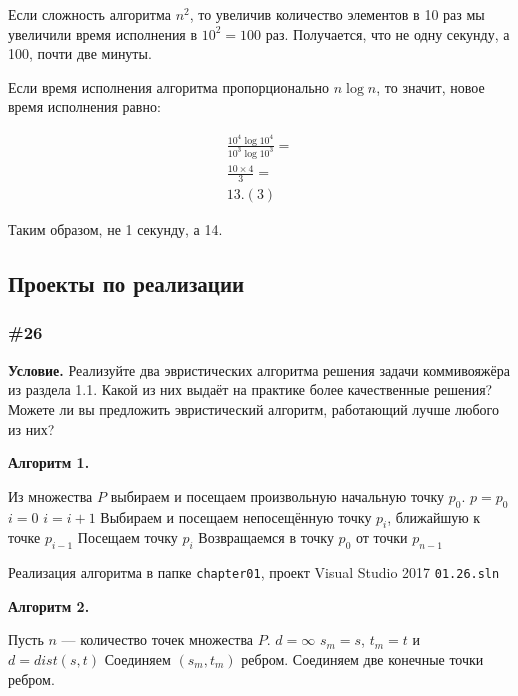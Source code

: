 \documentclass{article}
\begin{document}
Если сложность алгоритма $n^2$, то увеличив количество элементов в 10 раз мы увеличили
время исполнения в $10^2 = 100$ раз.
Получается, что не одну секунду, а 100, почти две минуты.

Если время исполнения алгоритма пропорционально $n \log{n}$, то значит,
новое время исполнения равно:

\begin{eqnarray}
    \frac{10^4 \log{10^4}}{10^3 \log{10^3}} =\\
    \frac{10 \times 4}{3} =\\
    13.(3)
\end{eqnarray}

Таким образом, не 1 секунду, а 14.

\subsection{Проекты по реализации}

\subsubsection{\#26}

\textbf{Условие.}
Реализуйте два эвристических алгоритма решения задачи коммивояжёра из раздела 1.1.
Какой из них выдаёт на практике более качественные решения?
Можете ли вы предложить эвристический алгоритм, работающий лучше любого из них?

\textbf{Алгоритм 1.}

\begin{algorithmic}[1]
        \State Из множества $P$ выбираем и посещаем произвольную начальную точку $p_0$.
        \State $p = p_0$
        \State $i = 0$
            \State $i = i + 1$
            \State Выбираем и посещаем непосещённую точку $p_i$, ближайшую к точке $p_{i-1}$
            \State Посещаем точку $p_i$
        \EndWhile
        \State Возвращаемся в точку $p_0$ от точки $p_{n-1}$
    \EndFunction
\end{algorithmic}

Реализация алгоритма в папке \texttt{chapter01}, проект Visual Studio 2017 \texttt{01.26.sln}

\textbf{Алгоритм 2.}

\begin{algorithmic}[1]
        \State Пусть $n$ --- количество точек множества $P$.
            \State $d = \infty$
                    \State $s_m = s$, $t_m = t$ и $d = dist(s,t)$
                \EndIf
                \State Соединяем $(s_m, t_m)$ ребром.
            \EndFor
        \EndFor
        \State Соединяем две конечные точки ребром.
    \EndFunction
\end{algorithmic}
\end{document}
